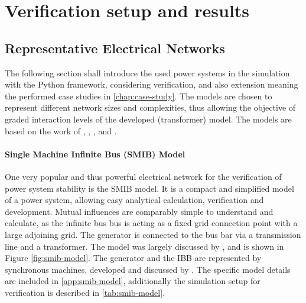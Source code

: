 

\chapter{Verification setup and results}


\section{Representative Electrical Networks}

The following section shall introduce the used power systems in the simulation with the Python framework, considering verification, and also extension meaning the performed case studies in \autoref{chap:case-study}. The models are chosen to represent different network sizes and complexities, thus allowing the objective of graded interaction levels of the developed (transformer) model. The models are based on the work of \textcite{machowskiPowerSystemDynamics2020}, \textcite{kundurPowerSystemStability2022}, \textcite{IEEEGuideLoad2022}, and \textcite{vancutsemTestSystemsVoltage2020}.

\subsubsection{Single Machine Infinite Bus (SMIB) Model}

One very popular and thus powerful electrical network for the verification of power system stability is the \acs{SMIB} model. It is a compact and simplified model of a power system, allowing easy analytical calculation, verification and development. Mutual influences are comparably simple to understand and calculate, as the infinite bus bus is acting as a fixed grid connection point with a large adjoining grid. The generator is connected to the bus bar via a transmission line and a transformer. The model was largely discussed by \textcite{kundurPowerSystemStability2022}, and is shown in Figure \ref{fig:smib-model}. The generator and the \acs{IBB} are represented by synchronous machines, developed and discussed by \textcite{kordowichPhysicsInformedMachine2023}. The specific model details are included in \autoref{app:smib-model}, additionally the simulation setup for verification is described in \autoref{tab:smib-model}.

